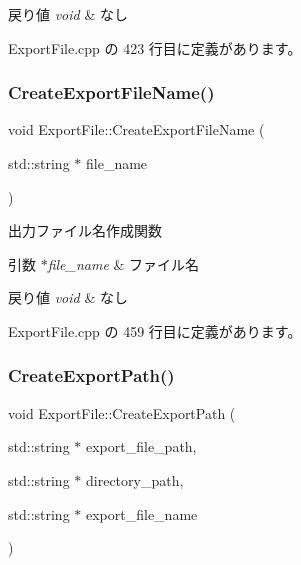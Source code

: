 \begin{DoxyRetVals}{戻り値}
{\em void} & なし \\
\hline
\end{DoxyRetVals}


 Export\+File.\+cpp の 423 行目に定義があります。

\mbox{\label{class_export_file_a28a889812b0d24741f0466ff21ea4f82}} 
\subsubsection{\texorpdfstring{Create\+Export\+File\+Name()}{CreateExportFileName()}}
{\footnotesize\ttfamily void Export\+File\+::\+Create\+Export\+File\+Name (\begin{DoxyParamCaption}\item[{std\+::string $\ast$}]{file\+\_\+name }\end{DoxyParamCaption})\hspace{0.3cm}{\ttfamily [private]}}



出力ファイル名作成関数 


\begin{DoxyParams}{引数}
{\em $\ast$file\+\_\+name} & ファイル名 \\
\hline
\end{DoxyParams}

\begin{DoxyRetVals}{戻り値}
{\em void} & なし \\
\hline
\end{DoxyRetVals}


 Export\+File.\+cpp の 459 行目に定義があります。

\mbox{\label{class_export_file_afff4247767f7ad05091d60cba9279816}} 
\subsubsection{\texorpdfstring{Create\+Export\+Path()}{CreateExportPath()}}
{\footnotesize\ttfamily void Export\+File\+::\+Create\+Export\+Path (\begin{DoxyParamCaption}\item[{std\+::string $\ast$}]{export\+\_\+file\+\_\+path,  }\item[{std\+::string $\ast$}]{directory\+\_\+path,  }\item[{std\+::string $\ast$}]{export\+\_\+file\+\_\+name }\end{DoxyParamCaption})\hspace{0.3cm}{\ttfamily [private]}}



